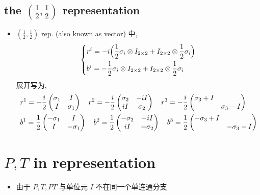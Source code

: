 \subsection{the \texorpdfstring{$(\frac{1}{2}, \frac{1}{2})$}{(1/2, 0)} representation}
\begin{itemize}
	\item $(\frac{1}{2}, \frac{1}{2})$ rep. (also known as vector) 中,
	\begin{equation}
		\begin{dcases}
			r^i = - i \Big( \frac{1}{2} \sigma_i \otimes I_{2 \times 2} + I_{2 \times 2} \otimes \frac{1}{2} \sigma_i \Big) \\
			b^i = - \frac{1}{2} \sigma_i \otimes I_{2 \times 2} + I_{2 \times 2} \otimes \frac{1}{2} \sigma_i
		\end{dcases}
	\end{equation}
	展开写为,
	\begin{align}
		& r^1 = - \frac{i}{2} \begin{pmatrix}
			\sigma_1 & I \\
			I & \sigma_1
		\end{pmatrix} \quad r^2 = - \frac{i}{2} \begin{pmatrix}
			\sigma_2 & - i I \\
			i I & \sigma_2
		\end{pmatrix} \quad r^3 = - \frac{i}{2} \begin{pmatrix}
			\sigma_3 + I & \\
			& \sigma_3 - I
		\end{pmatrix} \notag \\
		& b^1 = \frac{1}{2} \begin{pmatrix}
			- \sigma_1 & I \\
			I & - \sigma_1
		\end{pmatrix} \quad b^2 = \frac{1}{2} \begin{pmatrix}
			- \sigma_2 & - i I \\
			i I & - \sigma_2
		\end{pmatrix} \quad b^3 = \frac{1}{2} \begin{pmatrix}
			- \sigma_3 + I & \\
			& - \sigma_3 - I
		\end{pmatrix}
	\end{align}
\end{itemize}

\section{\texorpdfstring{$P, T$}{P, T} in representation}
\begin{itemize}
	\item 由于 $P, T, P T$ 与单位元 $I$ 不在同一个单连通分支
\end{itemize}
